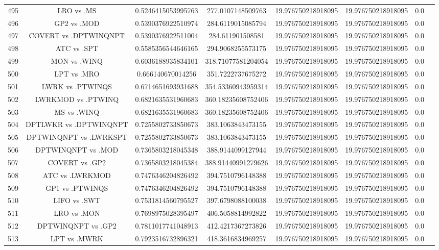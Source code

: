 \documentclass[a3paper,10pt]{article}
\begin{document}
\begin{table}[!htp]
\begin{tabular}{cccccccc}
495&LRO vs .MS&0.5246415053995763&277.0107148509763&19.976750218918095&19.976750218918095&0.0\\
496&GP2 vs .MOD&0.5390376922510974&284.6119015085794&19.976750218918095&19.976750218918095&0.0\\
497&COVERT vs .DPTWINQNPT&0.5390376922511004&284.611901508581&19.976750218918095&19.976750218918095&0.0\\
498&ATC vs .SPT&0.5585356544646165&294.9068255573175&19.976750218918095&19.976750218918095&0.0\\
499&MON vs .WINQ&0.6036188935834101&318.71077581204054&19.976750218918095&19.976750218918095&0.0\\
500&LPT vs .MRO&0.666140670014256&351.7222737675272&19.976750218918095&19.976750218918095&0.0\\
501&LWRK vs .PTWINQS&0.6714651693931688&354.53360943959314&19.976750218918095&19.976750218918095&0.0\\
502&LWRKMOD vs .PTWINQ&0.6821635531960683&360.18235608752406&19.976750218918095&19.976750218918095&0.0\\
503&MS vs .WINQ&0.6821635531960683&360.18235608752406&19.976750218918095&19.976750218918095&0.0\\
504&DPTLWKR vs .DPTWINQNPT&0.7255802733850673&383.1063843473155&19.976750218918095&19.976750218918095&0.0\\
505&DPTWINQNPT vs .LWRKSPT&0.7255802733850673&383.1063843473155&19.976750218918095&19.976750218918095&0.0\\
506&DPTWINQNPT vs .MOD&0.7365803218045348&388.9144099127944&19.976750218918095&19.976750218918095&0.0\\
507&COVERT vs .GP2&0.7365803218045384&388.91440991279626&19.976750218918095&19.976750218918095&0.0\\
508&ATC vs .LWRKMOD&0.7476346204826492&394.7510796148388&19.976750218918095&19.976750218918095&0.0\\
509&GP1 vs .PTWINQS&0.7476346204826492&394.7510796148388&19.976750218918095&19.976750218918095&0.0\\
510&LIFO vs .SWT&0.7531814560795527&397.6798088100038&19.976750218918095&19.976750218918095&0.0\\
511&LRO vs .MON&0.7698975028395497&406.5058814992822&19.976750218918095&19.976750218918095&0.0\\
512&DPTWINQNPT vs .GP2&0.7811017741048913&412.4217367273826&19.976750218918095&19.976750218918095&0.0\\
513&LPT vs .MWRK&0.7923516732896321&418.3616834969257&19.976750218918095&19.976750218918095&0.0\\

\end{tabular}
\end{table}
\end{document}

